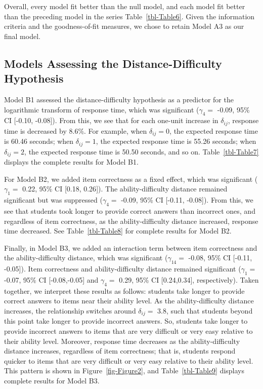 \documentclass[
  number]{elsarticle}
\begin{document}
Overall, every model fit better than the null model, and each model fit
better than the preceding model in the series Table~\ref{tbl-Table6}.
Given the information criteria and the goodness-of-fit measures, we
chose to retain Model A3 as our final model.

\subsection{Models Assessing the Distance-Difficulty
Hypothesis}\label{models-assessing-the-distance-difficulty-hypothesis}

Model B1 assessed the distance-difficulty hypothesis as a predictor for
the logarithmic transform of response time, which was significant
(\(γ_4=\) -0.09, 95\% CI {[}-0.10, -0.08{]}). From this, we see that for
each one-unit increase in \(δ_{ij}\), response time is decreased by
8.6\%. For example, when \(δ_{ij}=0\), the expected response time is
60.46 seconds; when \(δ_{ij}=1\), the expected response time is 55.26
seconds; when \(δ_{ij}=2\), the expected response time is 50.50 seconds,
and so on. Table~\ref{tbl-Table7} displays the complete results for
Model B1.

For Model B2, we added item correctness as a fixed effect, which was
significant (\(γ_1=\) 0.22, 95\% CI {[}0.18, 0.26{]}). The
ability-difficulty distance remained significant but was suppressed
(\(γ_4=\) -0.09, 95\% CI {[}-0.11, -0.08{]}). From this, we see that
students took longer to provide correct answers than incorrect ones, and
regardless of item correctness, as the ability-difficulty distance
increased, response time decreased. See Table~\ref{tbl-Table8} for
complete results for Model B2.

Finally, in Model B3, we added an interaction term between item
correctness and the ability-difficulty distance, which was significant
(\(γ_{14}=\) -0.08, 95\% CI {[}-0.11, -0.05{]}). Item correctness and
ability-difficulty distance remained significant (\(γ_1=\) -0.07, 95\%
CI {[}-0.08,-0.05{]} and \(γ_4=\) 0.29, 95\% CI {[}0.24,0.34{]},
respectively). Taken together, we interpret these results as follows:
students take longer to provide correct answers to items near their
ability level. As the ability-difficulty distance increases, the
relationship switches around \(δ_{ij}=\) 3.8, such that students beyond
this point take longer to provide incorrect answers. So, students take
longer to provide incorrect answers to items that are very difficult or
very easy relative to their ability level. Moreover, response time
decreases as the ability-difficulty distance increases, regardless of
item correctness; that is, students respond quicker to items that are
very difficult or very easy relative to their ability level. This
pattern is shown in Figure~\ref{fig-Figure2}, and Table~\ref{tbl-Table9}
displays complete results for Model B3.
\end{document}
